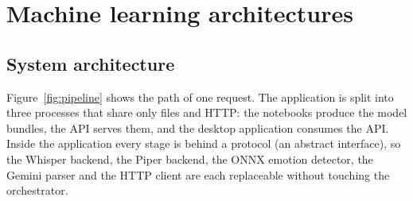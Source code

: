\section{Machine learning architectures}
\label{sec:architectures}

\subsection{System architecture}

Figure~\ref{fig:pipeline} shows the path of one request. The application is
split into three processes that share only files and HTTP: the notebooks
produce the model bundles, the API serves them, and the desktop application
consumes the API. Inside the application every stage is behind a protocol
(an abstract interface), so the Whisper backend, the Piper backend, the ONNX
emotion detector, the Gemini parser and the HTTP client are each
replaceable without touching the orchestrator.

